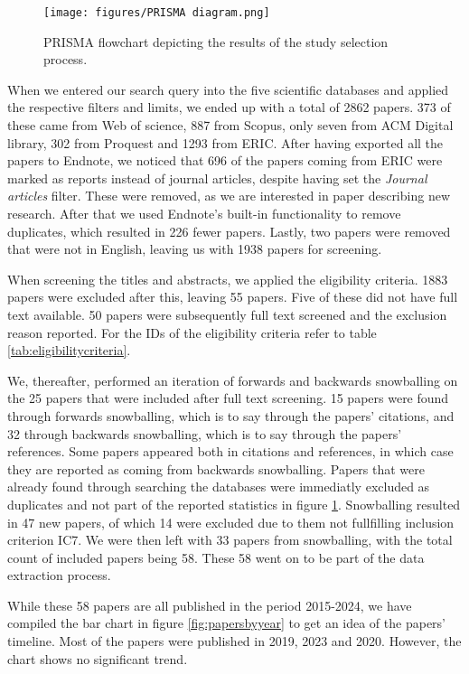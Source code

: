 \begin{figure}[h!]
    \centering
    \texttt{[image: figures/PRISMA diagram.png]}
    \caption{PRISMA flowchart depicting the results of the study selection process.}
    \label{fig:prisma-flowchart}
\end{figure}

When we entered our search query into the five scientific databases and applied the respective filters and limits, we ended up with a total of 2862 papers. 373 of these came from Web of science, 887 from Scopus, only seven from ACM Digital library, 302 from Proquest and 1293 from ERIC. After having exported all the papers to Endnote, we noticed that 696 of the papers coming from ERIC were marked as reports instead of journal articles, despite having set the \textit{Journal articles} filter. These were removed, as we are interested in paper describing new research. After that we used Endnote's built-in functionality to remove duplicates, which resulted in 226 fewer papers. Lastly, two papers were removed that were not in English, leaving us with 1938 papers for screening.

When screening the titles and abstracts, we applied the eligibility criteria. 1883 papers were excluded after this, leaving 55 papers. Five of these did not have full text available. 50 papers were subsequently full text screened and the exclusion reason reported. For the IDs of the eligibility criteria refer to table \ref{tab:eligibilitycriteria}.

We, thereafter, performed an iteration of forwards and backwards snowballing on the 25 papers that were included after full text screening. 15 papers were found through forwards snowballing, which is to say through the papers' citations, and 32 through backwards snowballing, which is to say through the papers' references. Some papers appeared both in citations and references, in which case they are reported as coming from backwards snowballing. Papers that were already found through searching the databases were immediatly excluded as duplicates and not part of the reported statistics in figure \ref{fig:prisma-flowchart}. Snowballing resulted in 47 new papers, of which 14 were excluded due to them not fullfilling inclusion criterion IC7. We were then left with 33 papers from snowballing, with the total count of included papers being 58. These 58 went on to be part of the data extraction process.

While these 58 papers are all published in the period 2015-2024, we have compiled the bar chart in figure \ref{fig:papersbyyear} to get an idea of the papers' timeline. Most of the papers were published in 2019, 2023 and 2020. However, the chart shows no significant trend.

